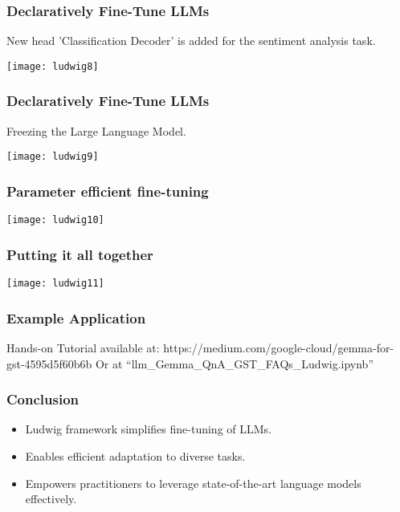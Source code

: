 \begin{frame}[fragile]\frametitle{Declaratively Fine-Tune LLMs}

New head 'Classification Decoder' is added for the sentiment analysis task.

		\begin{center}
		\texttt{[image: ludwig8]}
		\end{center}

\end{frame}

\begin{frame}[fragile]\frametitle{Declaratively Fine-Tune LLMs}

Freezing the Large Language Model.

		\begin{center}
		\texttt{[image: ludwig9]}
		\end{center}

\end{frame}

\begin{frame}[fragile]\frametitle{Parameter efficient fine-tuning}

		\begin{center}
		\texttt{[image: ludwig10]}
		\end{center}

\end{frame}

\begin{frame}[fragile]\frametitle{Putting it all together}

		\begin{center}
		\texttt{[image: ludwig11]}
		\end{center}

\end{frame}

\begin{frame}[fragile]\frametitle{Example Application}

Hands-on Tutorial available at: https://medium.com/google-cloud/gemma-for-gst-4595d5f60b6b
Or at ``llm\_Gemma\_QnA\_GST\_FAQs\_Ludwig.ipynb''

\end{frame}

\begin{frame}[fragile]\frametitle{Conclusion}
    \begin{itemize}
        \item Ludwig framework simplifies fine-tuning of LLMs.
        \item Enables efficient adaptation to diverse tasks.
        \item Empowers practitioners to leverage state-of-the-art language models effectively.
    \end{itemize}
\end{frame}
